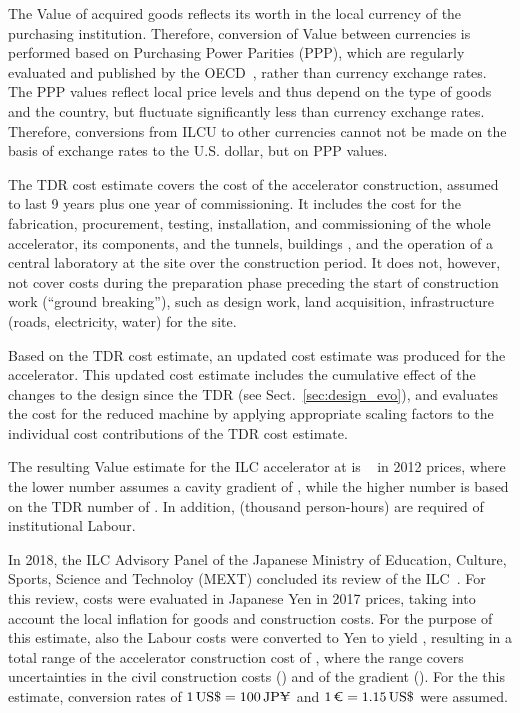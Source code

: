 The Value of acquired goods reflects its worth in the local currency of the purchasing institution. 
Therefore, conversion of Value between currencies is performed based on Purchasing Power Parities (PPP), which are regularly evaluated and published by the OECD~\cite{OECD:2018,Eurostat:2012}, rather than currency exchange rates. 
The PPP values reflect local price levels and thus depend on the type of goods and the country, but fluctuate significantly less than currency exchange rates.
Therefore, conversions from ILCU to other currencies cannot not be made on the basis of exchange rates to the U.S. dollar, but on PPP values.

The TDR cost estimate covers the cost of the accelerator construction, assumed to last 9 years plus one year of commissioning. 
It includes the cost for the fabrication, procurement, testing, installation, and commissioning of the whole accelerator, its components, and the tunnels, buildings \etc, and the operation of a central laboratory at the site over the construction period. 
It does not, however, not cover costs during the preparation phase preceding the start of construction work (``ground breaking''), such as design work, land acquisition, infrastructure (roads, electricity, water) for the site.

Based on the TDR cost estimate, an updated cost estimate was produced for the  accelerator. 
This updated cost estimate includes the cumulative effect of the changes to the design since the TDR (see Sect.~\ref{sec:design_evo}), and evaluates the cost for the reduced machine by applying appropriate scaling factors to the individual cost contributions of the TDR cost estimate.

The resulting Value estimate for the ILC accelerator at  is 
~\cite{Evans:2017rvt} in 2012 prices, where the lower number assumes a cavity gradient of , while the higher number is based on the TDR number of . 
In addition,  (thousand person-hours) are required of institutional Labour.

In 2018, the ILC Advisory Panel of the Japanese Ministry of Education, Culture, Sports, Science and Technoloy (MEXT) concluded its review of the ILC~\cite{ILCAP:2018}. 
For this review, costs were evaluated in Japanese Yen in 2017 prices, taking into account the local inflation for goods and construction costs.
For the purpose of this estimate, also the Labour costs were converted to Yen to yield , resulting in a total range of the accelerator construction cost of , where the range covers uncertainties in the civil construction costs () and of the gradient ().
For the this estimate, conversion rates of $\siunit{1}{US\$} = \siunit{100}{JP\yen}$ and $\siunit{1}{\matheuro} = \siunit{1.15}{US\$}$ were assumed.

